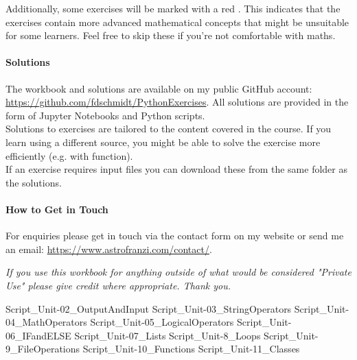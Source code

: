 \documentclass[
  12pt,					%
  a4paper,				%
  twoside,				%
]{report}
\begin{document}
Additionally, some exercises will be marked with a red . This indicates that the exercises contain more advanced mathematical concepts that might be unsuitable for some learners. Feel free to skip these if you're not comfortable with maths.


\paragraph{Solutions}
The workbook and solutions are available on my public GitHub account: \url{https://github.com/fdschmidt/PythonExercises}. All solutions are provided in the form of Jupyter Notebooks and Python scripts.\\
Solutions to exercises are tailored to the content covered in the course. If you learn using a different source, you might be able to solve the exercise more efficiently (e.g. with function).\\
If an exercise requires input files you can download these from the same folder as the solutions.

\paragraph{How to Get in Touch}
For enquiries please get in touch via the contact form on my website or send me an email: \url{https://www.astrofranzi.com/contact/}.


\vspace*{\fill}
\begin{center}
\textit{If you use this workbook for anything outside of what would be considered "Private Use" please give credit where appropriate. Thank you.}
\end{center}



		
{Script_Unit-02_OutputAndInput}		
{Script_Unit-03_StringOperators}
{Script_Unit-04_MathOperators}	 {Script_Unit-05_LogicalOperators}
{Script_Unit-06_IFandELSE}
{Script_Unit-07_Lists}
{Script_Unit-8_Loops}
{Script_Unit-9_FileOperations} 
{Script_Unit-10_Functions}
{Script_Unit-11_Classes}





\thispagestyle{plain}



\printindex
\end{document}
